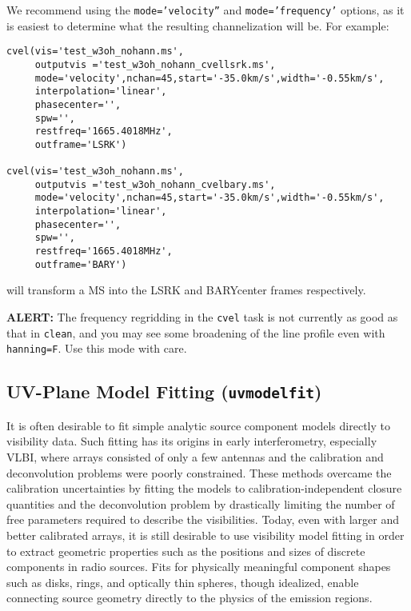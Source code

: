 We recommend using the {\tt mode='velocity''} and {\tt  mode='frequency'}
options, as it is easiest to determine what the resulting
channelization will be.  For example:
\small
\begin{verbatim}
cvel(vis='test_w3oh_nohann.ms',
     outputvis ='test_w3oh_nohann_cvellsrk.ms',
     mode='velocity',nchan=45,start='-35.0km/s',width='-0.55km/s',
     interpolation='linear',
     phasecenter='',
     spw='',
     restfreq='1665.4018MHz',
     outframe='LSRK')

cvel(vis='test_w3oh_nohann.ms',
     outputvis ='test_w3oh_nohann_cvelbary.ms',
     mode='velocity',nchan=45,start='-35.0km/s',width='-0.55km/s',
     interpolation='linear',
     phasecenter='',
     spw='',
     restfreq='1665.4018MHz',
     outframe='BARY')

\end{verbatim}
\normalsize
will transform a MS into the LSRK and BARYcenter frames respectively.

{\bf ALERT:} The frequency regridding in the {\tt cvel} task is not
currently as good as that in {\tt clean}, and you may see some
broadening of the line profile even with {\tt hanning=F}.  Use this
mode with care.

\subsection{UV-Plane Model Fitting ({\tt uvmodelfit})}
\label{section:cal.other.uvmodelfit}

It is often desirable to fit simple analytic source component models
directly to visibility data.  Such fitting has its origins in early
interferometry, especially VLBI, where arrays consisted of only a few
antennas and the calibration and deconvolution problems were poorly
constrained.  These methods overcame the calibration uncertainties by
fitting the models to calibration-independent closure quantities and
the deconvolution problem by drastically limiting the number of free
parameters required to describe the visibilities.  Today, even with
larger and better calibrated arrays, it is still desirable to use
visibility model fitting in order to extract geometric properties such
as the positions and sizes of discrete components in radio sources.
Fits for physically meaningful component shapes such as disks, rings,
and optically thin spheres, though idealized, enable connecting source
geometry directly to the physics of the emission regions.

